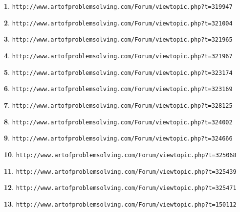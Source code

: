 \documentclass{article}
\theoremstyle{definition}
\newtheorem{s}{}
\begin{document}
\begin{s}
\texttt{http://www.artofproblemsolving.com/Forum/viewtopic.php?t=319947}
\end{s}

\begin{s}
\texttt{http://www.artofproblemsolving.com/Forum/viewtopic.php?t=321004}
\end{s}

\begin{s}
\texttt{http://www.artofproblemsolving.com/Forum/viewtopic.php?t=321965}
\end{s}

\begin{s}
\texttt{http://www.artofproblemsolving.com/Forum/viewtopic.php?t=321967}
\end{s}

\begin{s}
\texttt{http://www.artofproblemsolving.com/Forum/viewtopic.php?t=323174}
\end{s}

\begin{s}
\texttt{http://www.artofproblemsolving.com/Forum/viewtopic.php?t=323169}
\end{s}

\begin{s}
\texttt{http://www.artofproblemsolving.com/Forum/viewtopic.php?t=328125}
\end{s}

\begin{s}
\texttt{http://www.artofproblemsolving.com/Forum/viewtopic.php?t=324002}
\end{s}

\begin{s}
\texttt{http://www.artofproblemsolving.com/Forum/viewtopic.php?t=324666}
\end{s}

\begin{s}
\texttt{http://www.artofproblemsolving.com/Forum/viewtopic.php?t=325068}
\end{s}

\begin{s}
\texttt{http://www.artofproblemsolving.com/Forum/viewtopic.php?t=325439}
\end{s}

\begin{s}
\texttt{http://www.artofproblemsolving.com/Forum/viewtopic.php?t=325471}
\end{s}

\begin{s}
\texttt{http://www.artofproblemsolving.com/Forum/viewtopic.php?t=150112}
\end{s}
\end{document}
